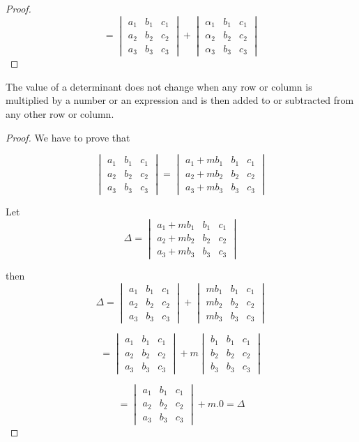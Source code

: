 \begin{proof}
$$= \begin{vmatrix}a_1 & b_1 & c_1\\a_2 & b_2 & c_2 \\ a_3 & b_3 &
c_3\end{vmatrix} + \begin{vmatrix}\alpha_1 & b_1 & c_1\\\alpha_2 &
b_2 & c_2 \\ \alpha_3 & b_3 & c_3\end{vmatrix}$$
\end{proof}

\begin{theorem}
  The value of a determinant does not change when any row or column is multiplied by a number or an expression and is then added to
  or subtracted from any other row or column.
\end{theorem}

\begin{proof}
  We have to prove that

$$\begin{vmatrix}a_1 & b_1 & c_1\\a_2 & b_2 & c_2 \\ a_3 & b_3 &
c_3\end{vmatrix} = \begin{vmatrix}a_1 + mb_1 & b_1 & c_1\\a_2 + mb_2 & b_2 & c_2
\\ a_3 + mb_3 & b_3 & c_3\end{vmatrix}$$

Let $$\Delta = \begin{vmatrix}a_1 + mb_1 & b_1 & c_1\\a_2 + mb_2 & b_2 & c_2
\\ a_3 + mb_3 & b_3 & c_3\end{vmatrix}$$

then $$\Delta = \begin{vmatrix}a_1 & b_1 & c_1\\a_2 & b_2 & c_2 \\ a_3 & b_3 &
c_3\end{vmatrix} + \begin{vmatrix}mb_1 & b_1 & c_1\\mb_2 & b_2 & c_2
\\mb_3 & b_3 & c_3\end{vmatrix}$$

$$= \begin{vmatrix}a_1 & b_1 & c_1\\a_2 & b_2 & c_2 \\ a_3 & b_3 &
c_3\end{vmatrix} + m \begin{vmatrix}b_1 & b_1 & c_1\\b_2 & b_2 & c_2 \\ b_3 & b_3 &
c_3\end{vmatrix}$$

$$= \begin{vmatrix}a_1 & b_1 & c_1\\a_2 & b_2 & c_2 \\ a_3 & b_3 &
c_3\end{vmatrix} + m.0 = \Delta$$
\end{proof}

